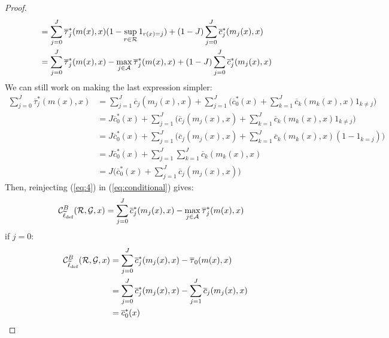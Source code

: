 \begin{appendices}
\begin{proof}
\begin{equation}
\begin{aligned}
        & = \sum_{j=0}^J \overline{\tau}_j^\ast(m(x),x)(1-\sup_{r\in\mathcal{R}}1_{r(x)=j}) + (1-J)\sum_{j=0}^J \overline{c}^\ast_j(m_j(x),x)\\
        & = \sum_{j=0}^J \overline{\tau}_j^\ast(m(x),x) - \max_{j\in\mathcal{A}}\overline{\tau}_j^\ast(m(x),x) + (1-J)\sum_{j=0}^J \overline{c}^\ast_j(m_j(x),x)
    \end{aligned}
\end{equation}
We can still work on making the last expression simpler: 
\begin{equation} \label{eq:4}
    \begin{aligned}
\sum_{j=0}^J\overline{\tau}_j^\ast(m(x),x) & = \sum_{j=1}^J\overline{c}_j(m_j(x),x) + \sum_{j=1}^J\Big(\overline{c}_0^\ast(x) + \sum_{k=1}^J \overline{c}_k(m_k(x),x) 1_{k\not=j}\Big) \\
& = J\overline{c}_0^\ast(x) + \sum_{j=1}^J\Big(\overline{c}_j(m_j(x),x) + \sum_{k=1}^J \overline{c}_k(m_k(x),x) 1_{k\not=j} \Big) \\
& = J\overline{c}_0^\ast(x) + \sum_{j=1}^J\Big(\overline{c}_j(m_j(x),x) + \sum_{k=1}^J \overline{c}_k(m_k(x),x) (1-1_{k=j}) \Big)  \\
& = J\overline{c}_0^\ast(x) + \sum_{j=1}^J\sum_{k=1}^J\overline{c}_k(m_k(x),x) \\
& = J\Big(\overline{c}_0^\ast(x) +\sum_{j=1}^J \overline{c}_j(m_j(x),x)\Big)
\end{aligned}
\end{equation}
Then, reinjecting (\ref{eq:4}) in (\ref{eq:conditional}) gives:
\begin{equation}
    \begin{aligned}
        \mathcal{C}_{\widetilde{\ell}_{\text{def}}}^B(\mathcal{R}, \mathcal{G},x) & = \sum_{j=0}^J\overline{c}_j^\ast(m_j(x),x) - \max_{j\in\mathcal{A}}\overline{\tau}_j^\ast (m(x),x) 
    \end{aligned}
\end{equation}
if $j=0$: 
\begin{equation}
    \begin{aligned}
        \mathcal{C}_{\widetilde{\ell}_{\text{def}}}^B(\mathcal{R}, \mathcal{G},x) & = \sum_{j=0}^J\overline{c}_j^\ast(m_j(x),x) - \overline{\tau}_0(m(x),x)  \\
        &= \sum_{j=0}^J\overline{c}_j^\ast(m_j(x),x) - \sum_{j=1}^J \overline{c}_j(m_j(x),x) \\
        & = \overline{c}^\ast_0(x)
    \end{aligned}
\end{equation}


\end{proof}
\end{appendices}
